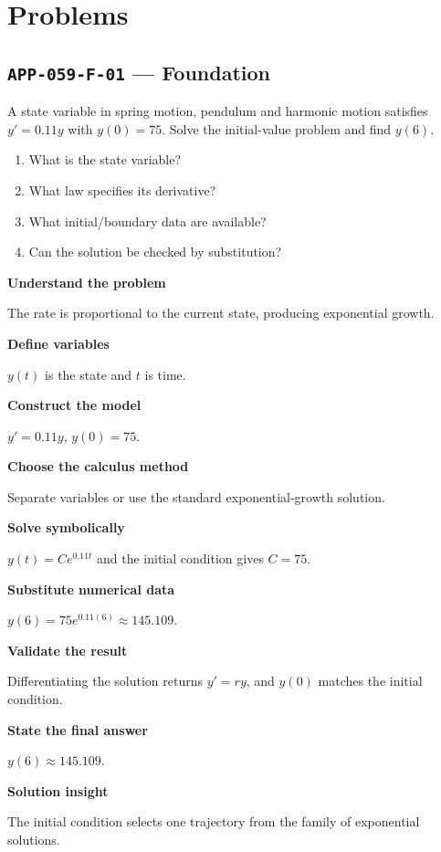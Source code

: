 \documentclass[11pt]{book}
\newcommand{\pid}[1]{\texttt{#1}}
\begin{document}
\section*{Problems}
\subsection*{\pid{APP-059-F-01} — Foundation}
\begin{problembox}
A state variable in spring motion, pendulum and harmonic motion satisfies $y'=0.11y$ with $y(0)=75$. Solve the initial-value problem and find $y(6)$.
\end{problembox}
\begin{promptbox}\begin{enumerate}
\item What is the state variable?
\item What law specifies its derivative?
\item What initial/boundary data are available?
\item Can the solution be checked by substitution?
\end{enumerate}\end{promptbox}
\begin{solutionbox}
\textbf{Understand the problem}\par The rate is proportional to the current state, producing exponential growth.\par\medskip
\textbf{Define variables}\par $y(t)$ is the state and $t$ is time.\par\medskip
\textbf{Construct the model}\par $y'=0.11y$, $y(0)=75$.\par\medskip
\textbf{Choose the calculus method}\par Separate variables or use the standard exponential-growth solution.\par\medskip
\textbf{Solve symbolically}\par $y(t)=Ce^{0.11t}$ and the initial condition gives $C=75$.\par\medskip
\textbf{Substitute numerical data}\par $y(6)=75e^{0.11(6)}\approx 145.109$.\par\medskip
\textbf{Validate the result}\par Differentiating the solution returns $y'=ry$, and $y(0)$ matches the initial condition.\par\medskip
\textbf{State the final answer}\par $y(6)\approx 145.109$.\par\medskip
\textbf{Solution insight}\par The initial condition selects one trajectory from the family of exponential solutions.\par\medskip
\end{solutionbox}
\end{document}
